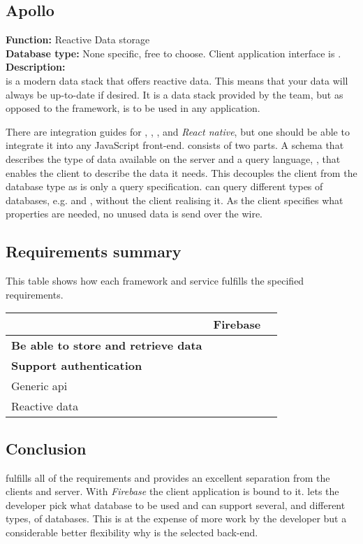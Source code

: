 \subsection*{Apollo}
\textbf{Function:} Reactive Data storage
\\
\textbf{Database type:} None specific, free to choose.
Client application interface is .
\\
\textbf{Description:}
\\
 is a modern data stack that offers reactive data.
This means that your data will always be up-to-date if desired.
It is a data stack provided by the  team, but as opposed to the  framework,  is to be used in any application.

There are integration guides for , , ,  and \textit{React native}, but one should be able to integrate it into any JavaScript front-end.
 consists of two parts.
A schema that describes the type of data available on the server and a query language, , that enables the client to describe the data it needs.
This decouples the client from the database type as  is only a query specification.
 can query different types of databases, e.g.  and , without the client realising it.
As the client specifies what properties are needed, no unused data is send over the wire.

\subsection*{Requirements summary}
This table shows how each framework and service fulfills the specified requirements.

	\begin{tabularx}{\textwidth}{|l|C C|}
	\hline
	 & Firebase &  \\
	\hline
	\textbf{Be able to store and retrieve data} & \cmark & \cmark \\
	\hline
	\textbf{Support authentication} & \cmark & \cmark \\
	\hline
	Generic \gls{api} & \xmark & \cmark \\
	\hline
	Reactive data & \cmark & \cmark \\
	\hline
	\end{tabularx}

\subsection*{Conclusion}
 fulfills all of the requirements and provides an excellent separation from the clients and server.
With \textit{Firebase} the client application is bound to it.
 lets the developer pick what database to be used and can support several, and different types, of databases.
This is at the expense of more work by the developer but a considerable better flexibility why  is the selected back-end.